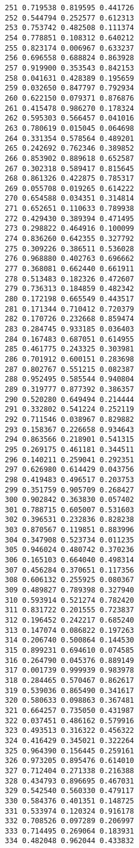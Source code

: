 \documentclass[
  10pt,
  a4paper,oneside]{article}
\begin{document}
\begin{verbatim}
251 0.719538 0.819595 0.441726
252 0.544794 0.252577 0.612313
253 0.753742 0.482508 0.111374
254 0.778851 0.108312 0.640212
255 0.823174 0.006967 0.633237
256 0.696558 0.688824 0.863928
257 0.919900 0.353543 0.842153
258 0.041631 0.428389 0.195659
259 0.032650 0.847797 0.792934
260 0.622150 0.079371 0.876876
261 0.415478 0.986270 0.178324
262 0.595303 0.566457 0.041016
263 0.780619 0.015045 0.064698
264 0.331354 0.578564 0.489201
265 0.242692 0.762346 0.389852
266 0.853902 0.889618 0.652587
267 0.302318 0.589417 0.815645
268 0.861326 0.422875 0.785317
269 0.055708 0.019265 0.614222
270 0.654588 0.034351 0.314814
271 0.652651 0.110633 0.789938
272 0.429430 0.389394 0.471495
273 0.298822 0.464916 0.100099
274 0.836260 0.642355 0.327792
275 0.309226 0.386511 0.536028
276 0.968880 0.402763 0.696662
277 0.368081 0.662440 0.661911
278 0.513483 0.182326 0.472607
279 0.736313 0.184859 0.482342
280 0.172198 0.665549 0.443517
281 0.171344 0.710412 0.720379
282 0.170726 0.232668 0.859474
283 0.284745 0.933185 0.036403
284 0.167483 0.687051 0.614955
285 0.461775 0.243325 0.303981
286 0.701912 0.600151 0.283698
287 0.802767 0.551215 0.082387
288 0.952495 0.585544 0.940804
289 0.319777 0.877392 0.386357
290 0.520280 0.649494 0.214444
291 0.332802 0.541224 0.252119
292 0.711546 0.038967 0.829882
293 0.158367 0.226658 0.934643
294 0.863566 0.218901 0.541315
295 0.269175 0.461181 0.344511
296 0.140211 0.259041 0.292351
297 0.626980 0.614429 0.043756
298 0.419483 0.496517 0.203753
299 0.351759 0.905709 0.268427
300 0.902842 0.363830 0.057402
301 0.788715 0.605007 0.531603
302 0.396531 0.232836 0.828238
303 0.870567 0.119851 0.883996
304 0.347908 0.523734 0.011235
305 0.946024 0.480742 0.370236
306 0.165103 0.664040 0.498314
307 0.456284 0.370651 0.117356
308 0.606132 0.255925 0.080367
309 0.489827 0.789398 0.327940
310 0.593914 0.521274 0.782420
311 0.831722 0.201555 0.723837
312 0.196452 0.242217 0.685240
313 0.147074 0.086822 0.197263
314 0.206740 0.500864 0.144530
315 0.899231 0.694610 0.074585
316 0.264790 0.045376 0.889149
317 0.001739 0.999939 0.983978
318 0.284465 0.570467 0.862617
319 0.539036 0.865490 0.341617
320 0.580633 0.098863 0.367481
321 0.664257 0.735050 0.431987
322 0.037451 0.486162 0.579916
323 0.493513 0.316322 0.456322
324 0.416429 0.345021 0.322264
325 0.964390 0.156445 0.259161
326 0.973205 0.895476 0.614010
327 0.712404 0.271338 0.216388
328 0.434793 0.896695 0.467031
329 0.542540 0.560330 0.479117
330 0.584376 0.401351 0.148725
331 0.533974 0.120324 0.916178
332 0.708526 0.097289 0.206997
333 0.714495 0.269064 0.183931
334 0.482048 0.962044 0.433832

\end{verbatim}
\end{document}
